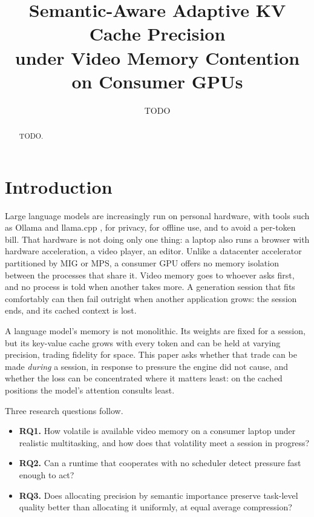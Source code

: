 \documentclass[11pt]{article}
\title{Semantic-Aware Adaptive KV Cache Precision\\
  under Video Memory Contention on Consumer GPUs}
\author{TODO}
\date{}
\begin{document}
\maketitle

\begin{abstract}
TODO.
\end{abstract}

\section{Introduction}
\label{sec:introduction}

Large language models are increasingly run on personal hardware, with tools such
as Ollama \cite{ollama} and llama.cpp \cite{llamacpp}, for privacy, for offline
use, and to avoid a per-token bill. That hardware is not doing only
one thing: a laptop also runs a browser with hardware acceleration, a video
player, an editor. Unlike a datacenter accelerator partitioned by MIG or MPS, a
consumer GPU offers no memory isolation between the processes that share it.
Video memory goes to whoever asks first, and no process is told when another
takes more. A generation session that fits comfortably can then fail outright
when another application grows: the session ends, and its cached context is
lost.

A language model's memory is not monolithic. Its weights are fixed for a session,
but its key-value cache grows with every token and can be held at varying
precision, trading fidelity for space. This paper asks whether that trade can be
made \textit{during} a session, in response to pressure the engine did not cause,
and whether the loss can be concentrated where it matters least: on the cached
positions the model's attention consults least.

Three research questions follow.
\begin{itemize}
\item \textbf{RQ1.} How volatile is available video memory on a consumer laptop
under realistic multitasking, and how does that volatility meet a session in
progress?
\item \textbf{RQ2.} Can a runtime that cooperates with no scheduler detect
pressure fast enough to act?
\item \textbf{RQ3.} Does allocating precision by semantic importance preserve
task-level quality better than allocating it uniformly, at equal average
compression?
\end{itemize}
\end{document}
